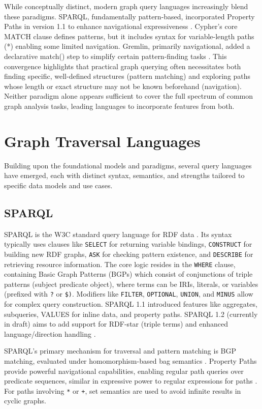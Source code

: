 \documentclass[sigconf,natbib=false]{acmart}
\begin{document}
While conceptually distinct, modern graph query languages increasingly blend these paradigms.
SPARQL, fundamentally pattern-based, incorporated Property Paths in version 1.1 to enhance navigational expressiveness \cite{SPARQL11Query}.
Cypher's core MATCH clause defines patterns, but it includes syntax for variable-length paths (*) enabling some limited navigation.
Gremlin, primarily navigational, added a declarative match() step to simplify certain pattern-finding tasks \cite{TinkerPopDocumentation}.
This convergence highlights that practical graph querying often necessitates both finding specific, well-defined structures (pattern matching) and exploring paths whose length or exact structure may not be known beforehand (navigation).
Neither paradigm alone appears sufficient to cover the full spectrum of common graph analysis tasks, leading languages to incorporate features from both.

\section{Graph Traversal Languages}

Building upon the foundational models and paradigms, several query languages have emerged, each with distinct syntax, semantics, and strengths tailored to specific data models and use cases.

\subsection{SPARQL}
SPARQL is the W3C standard query language for RDF data \cite{SPARQL11Query}.
Its syntax typically uses clauses like \texttt{SELECT} for returning variable bindings, \texttt{CONSTRUCT} for building new RDF graphs, \texttt{ASK} for checking pattern existence, and \texttt{DESCRIBE} for retrieving resource information.
The core logic resides in the \texttt{WHERE} clause, containing Basic Graph Patterns (BGPs) which consist of conjunctions of triple patterns (subject predicate object), where terms can be IRIs, literals, or variables (prefixed with \texttt{?} or \texttt{\$)}.
Modifiers like \texttt{FILTER}, \texttt{OPTIONAL}, \texttt{UNION}, and \texttt{MINUS} allow for complex query construction.
SPARQL 1.1 introduced features like aggregates, subqueries, VALUES for inline data, and property paths.
SPARQL 1.2 (currently in draft) aims to add support for RDF-star (triple terms) and enhanced language/direction handling \cite{SPARQL12Query}.

SPARQL's primary mechanism for traversal and pattern matching is BGP matching, evaluated under homomorphism-based bag semantics \cite{angles2018FoundationsModernQuery}.
Property Paths provide powerful navigational capabilities, enabling regular path queries over predicate sequences, similar in expressive power to regular expressions for paths \cite{SPARQL11Property}.
For paths involving \texttt{*} or \texttt{+}, set semantics are used to avoid infinite results in cyclic graphs.
\end{document}
